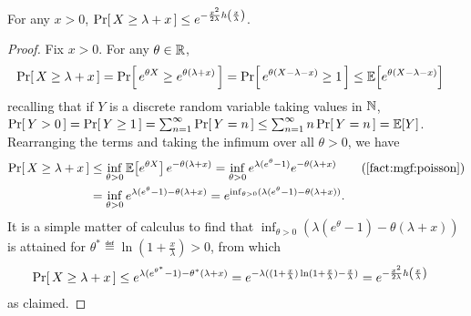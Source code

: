 \documentclass[10pt]{article}
\newcommand{\bennettfunc}{h}
\newcommand{\bennett}[1]{\bennettfunc\mleft(#1\mright)}
\begin{document}
\begin{fact}\label{fact:poisson:upper:tail}
  For any $x>0$, $\probaOf{ X \geq \lambda + x} \leq e^{-\frac{x^2}{2\lambda}\bennett{\frac{x}{\lambda}}}$.
\end{fact}
\begin{proof}
Fix $x> 0$. For any $\theta\in\mathbb{R}$,
\begin{align*}
    \Pr\!\left[\,  X \geq \lambda + x\, \right]
    &= \Pr\!\left[\,  e^{\theta X} \geq e^{\theta(\lambda + x)} \, \right]
    = \Pr\!\left[\,  e^{\theta(X - \lambda -x)} \geq 1\, \right]
    \leq \mathbb{E}\!\left[ e^{\theta(X - \lambda -x)} \right] 
\end{align*}
recalling that if $Y$ is a discrete random variable taking values in $\mathbb{N}$, $\Pr\!\left[\, Y > 0\, \right]=\Pr\!\left[\, Y \geq 1\, \right] = \sum_{n=1}^\infty \Pr\!\left[\, Y = n\, \right] \leq \sum_{n=1}^\infty n\Pr\!\left[\, Y = n\, \right] = \mathbb{E}\!\left[Y\right]$. Rearranging the terms and taking the infimum over all $\theta > 0$, we have
\begin{align*}
    \probaOf{ X \geq \lambda + x}
    &\leq \inf_{\theta > 0}\expect{ e^{\theta X} }e^{-\theta(\lambda+x)} = \inf_{\theta > 0}e^{\lambda(e^\theta-1)}e^{-\theta(\lambda+x)} \tag{\autoref{fact:mgf:poisson}} \\
    &= \inf_{\theta > 0}e^{\lambda(e^\theta-1) -\theta(\lambda+x)}
    = e^{\inf_{\theta > 0}( \lambda(e^\theta-1) -\theta(\lambda+x))}.
\end{align*}
It is a simple matter of calculus to find that $\inf_{\theta > 0}( \lambda(e^\theta-1) -\theta(\lambda+x))$ is attained for $\theta^\ast \eqdef \ln(1+\frac{x}{\lambda}) > 0$, from which
\begin{align*}
    \probaOf{ X \geq \lambda + x}
    &\leq e^{\lambda(e^{\theta^\ast}-1) -\theta^\ast(\lambda+x)}
    = e^{-\lambda((1+\frac{x}{\lambda})\ln(1+\frac{x}{\lambda})-\frac{x}{\lambda})} 
    = e^{-\frac{x^2}{2\lambda}\bennett{\frac{x}{\lambda}}} 
\end{align*}
as claimed.
\end{proof}
\end{document}
